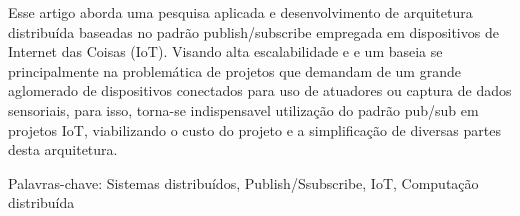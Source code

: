 \begin{resumo}
    Esse artigo aborda uma pesquisa aplicada e desenvolvimento de arquitetura distribuída baseadas no padrão publish/subscribe empregada em dispositivos de Internet das Coisas (IoT). Visando alta escalabilidade e  e um baseia se principalmente na problemática de projetos que demandam de um grande aglomerado de dispositivos conectados para uso de atuadores ou captura de dados sensoriais, para isso, torna-se indispensavel utilização do padrão pub/sub em projetos IoT, viabilizando o custo do projeto e a simplificação de diversas partes desta arquitetura.

Palavras-chave:
Sistemas distribuídos, Publish/Ssubscribe, IoT, Computação distribuída



\end{resumo}